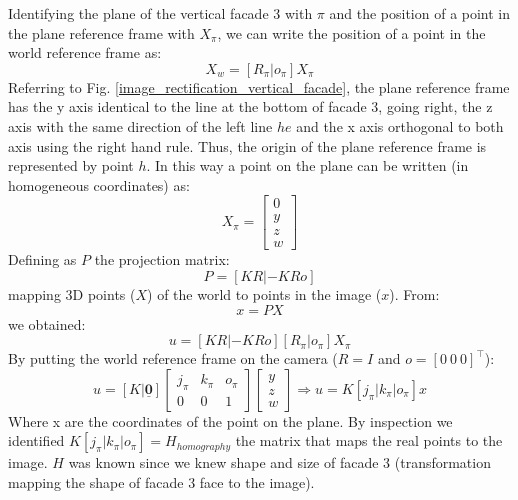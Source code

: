 \documentclass[11pt, oneside]{article}
\begin{document}
Identifying the plane of the vertical facade 3 with $\pi$ and the position of a point in the plane reference frame with $X_{\pi}$, we can write the position of a point in the world reference frame as:
\begin{equation}
	 X_w =[R_{\pi} | o_{\pi}]X_{\pi} 
\end{equation} 
Referring to Fig. \ref{image_rectification_vertical_facade}, the plane reference frame has the y axis identical to the line at the bottom of facade 3, going right, the z axis with the same direction of the left line $he$ and the x axis orthogonal to both axis using the right hand rule. Thus, the origin of the plane reference frame is represented by point $h$.
In this way a point on the plane can be written (in homogeneous coordinates) as:
\begin{equation}
	X_\pi = 
	\begin{bmatrix}
		0 \\ y \\ z \\ w
	\end{bmatrix}
\end{equation}
Defining as $P$ the projection matrix:
\begin{equation} \label{peq}
	P=[KR | -KRo]
\end{equation}
mapping 3D points ($X$) of the world to points in the image ($x$). From:
\begin{equation} \label{peq1}
	x = P X
\end{equation}
we obtained:
\begin{equation}
	u = [KR | -KRo] [R_{\pi} | o_{\pi}]X_{\pi}
\end{equation}
By putting the world reference frame on the camera ($R=I$ and $o=[0 \ 0\ 0]^\intercal$):
\begin{equation}
	u = [K|\underline{\mathbf{0}}]
	\begin{bmatrix}
		j_\pi & k_\pi & o_\pi \\ 0 & 0 & 1
	\end{bmatrix}
	\begin{bmatrix}
		y \\ z \\ w
	\end{bmatrix}
	\Rightarrow
	u = K [j_\pi | k_\pi | o_\pi] x
\end{equation}
Where x are the coordinates of the point on the plane. By inspection we identified $K [j_\pi | k_\pi | o_\pi] = H_{homography}$ the matrix that maps the real points to the image. $H$ was known since we knew shape and size of facade 3 (transformation mapping the shape of facade 3 face to the image).
\end{document}
